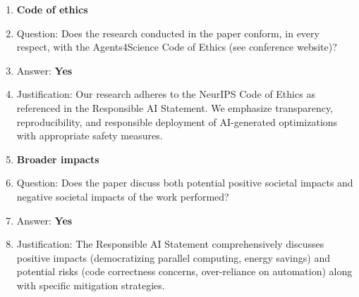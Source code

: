 \begin{enumerate}
\item {\bf Code of ethics}
    \item[] Question: Does the research conducted in the paper conform, in every respect, with the Agents4Science Code of Ethics (see conference website)?
    \item[] Answer: \textbf{Yes}
    \item[] Justification: Our research adheres to the NeurIPS Code of Ethics as referenced in the Responsible AI Statement. We emphasize transparency, reproducibility, and responsible deployment of AI-generated optimizations with appropriate safety measures.

\item {\bf Broader impacts}
    \item[] Question: Does the paper discuss both potential positive societal impacts and negative societal impacts of the work performed?
    \item[] Answer: \textbf{Yes}
    \item[] Justification: The Responsible AI Statement comprehensively discusses positive impacts (democratizing parallel computing, energy savings) and potential risks (code correctness concerns, over-reliance on automation) along with specific mitigation strategies.

\end{enumerate}
